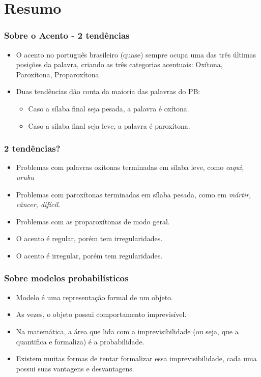 \documentclass[xcolor=table]{beamer}
\begin{document}
	\section{Resumo}
	\begin{frame}
		\frametitle{Sobre o Acento - 2 tendências}
		\begin{itemize}
			\item O acento no português brasileiro (quase) sempre ocupa uma das três últimas posições da palavra, criando as três categorias acentuais: Oxítona, Paroxítona, Proparoxítona.
			\item Duas tendências dão conta da maioria das palavras do PB:
			\begin{itemize}
				\item Caso a sílaba final seja pesada, a palavra é oxítona.\\
				\item Caso a sílaba final seja leve, a palavra é paroxítona.\\
			\end{itemize}
		\end{itemize}
	\end{frame}
	\begin{frame}
		\frametitle{2 tendências?}
		\begin{itemize}
			\item Problemas com palavras oxítonas terminadas em sílaba leve, como \textit{caqui, urubu}\\
			\item Problemas com paroxítonas terminadas em sílaba pesada, como em \textit{mártir, câncer, difícil}.\\
			\item Problemas com as proparoxítonas de modo geral.\\
			\item O acento é regular, porém tem irregularidades.\\
			\item O acento é irregular, porém tem regularidades.\\
		\end{itemize}

	\end{frame}	

	\begin{frame}
		\frametitle{Sobre modelos probabilísticos}
		\begin{itemize}
			\item Modelo é uma representação formal de um objeto.\\
			\item As vezes, o objeto possui comportamento imprevisível.\\
			\item Na matemática, a área que lida com a imprevisibilidade (ou seja, que a quantifica e formaliza) é a probabilidade.\\
			\item Existem muitas formas de tentar formalizar essa imprevisibilidade, cada uma possui suas vantagens e desvantagens.\\
		\end{itemize}
	\end{frame}
	
\end{document}
